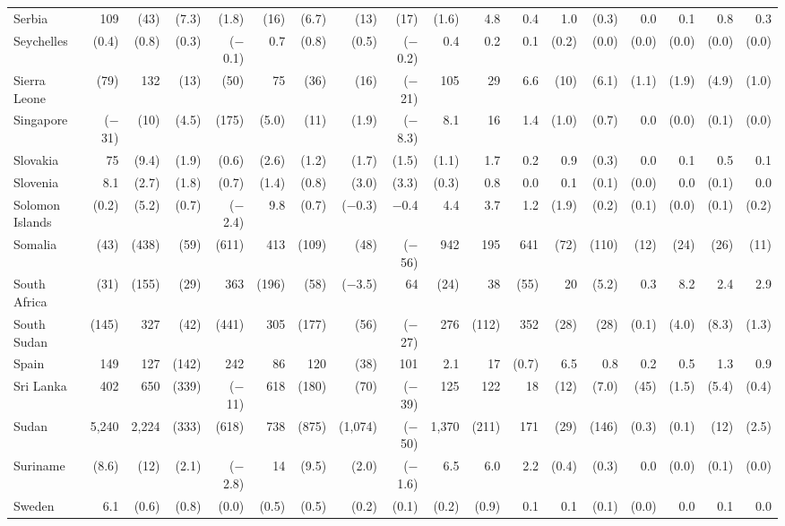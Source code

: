 \begin{longtable}{lrrrrrrrrrrrrrrrrr}
Serbia & 109 & (43) & (7.3) & (1.8) & (16) & (6.7) & (13) & (17) & (1.6) & 4.8 & 0.4 & 1.0 & (0.3) & 0.0 & 0.1 & 0.8 & 0.3 \\
Seychelles & (0.4) & (0.8) & (0.3) & ($-$0.1) & 0.7 & (0.8) & (0.5) & ($-$0.2) & 0.4 & 0.2 & 0.1 & (0.2) & (0.0) & (0.0) & (0.0) & (0.0) & (0.0) \\
Sierra Leone & (79) & 132 & (13) & (50) & 75 & (36) & (16) & ($-$21) & 105 & 29 & 6.6 & (10) & (6.1) & (1.1) & (1.9) & (4.9) & (1.0) \\
Singapore & ($-$31) & (10) & (4.5) & (175) & (5.0) & (11) & (1.9) & ($-$8.3) & 8.1 & 16 & 1.4 & (1.0) & (0.7) & 0.0 & (0.0) & (0.1) & (0.0) \\
Slovakia & 75 & (9.4) & (1.9) & (0.6) & (2.6) & (1.2) & (1.7) & (1.5) & (1.1) & 1.7 & 0.2 & 0.9 & (0.3) & 0.0 & 0.1 & 0.5 & 0.1 \\
Slovenia & 8.1 & (2.7) & (1.8) & (0.7) & (1.4) & (0.8) & (3.0) & (3.3) & (0.3) & 0.8 & 0.0 & 0.1 & (0.1) & (0.0) & 0.0 & (0.1) & 0.0 \\
Solomon Islands & (0.2) & (5.2) & (0.7) & ($-$2.4) & 9.8 & (0.7) & ($-$0.3) & $-$0.4 & 4.4 & 3.7 & 1.2 & (1.9) & (0.2) & (0.1) & (0.0) & (0.1) & (0.2) \\
Somalia & (43) & (438) & (59) & (611) & 413 & (109) & (48) & ($-$56) & 942 & 195 & 641 & (72) & (110) & (12) & (24) & (26) & (11) \\
South Africa & (31) & (155) & (29) & 363 & (196) & (58) & ($-$3.5) & 64 & (24) & 38 & (55) & 20 & (5.2) & 0.3 & 8.2 & 2.4 & 2.9 \\
South Sudan & (145) & 327 & (42) & (441) & 305 & (177) & (56) & ($-$27) & 276 & (112) & 352 & (28) & (28) & (0.1) & (4.0) & (8.3) & (1.3) \\
Spain & 149 & 127 & (142) & 242 & 86 & 120 & (38) & 101 & 2.1 & 17 & (0.7) & 6.5 & 0.8 & 0.2 & 0.5 & 1.3 & 0.9 \\
Sri Lanka & 402 & 650 & (339) & ($-$11) & 618 & (180) & (70) & ($-$39) & 125 & 122 & 18 & (12) & (7.0) & (45) & (1.5) & (5.4) & (0.4) \\
Sudan & 5,240 & 2,224 & (333) & (618) & 738 & (875) & (1,074) & ($-$50) & 1,370 & (211) & 171 & (29) & (146) & (0.3) & (0.1) & (12) & (2.5) \\
Suriname & (8.6) & (12) & (2.1) & ($-$2.8) & 14 & (9.5) & (2.0) & ($-$1.6) & 6.5 & 6.0 & 2.2 & (0.4) & (0.3) & 0.0 & (0.0) & (0.1) & (0.0) \\
Sweden & 6.1 & (0.6) & (0.8) & (0.0) & (0.5) & (0.5) & (0.2) & (0.1) & (0.2) & (0.9) & 0.1 & 0.1 & (0.1) & (0.0) & 0.0 & 0.1 & 0.0 \\

\end{longtable}
